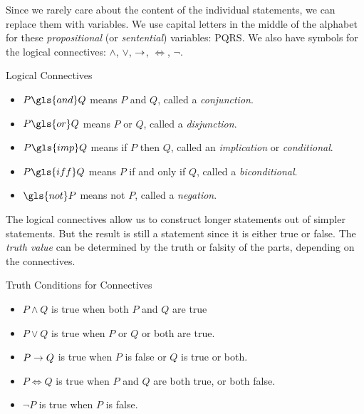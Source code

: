 \documentclass[12pt]{article}
\begin{document}
Since we rarely care about the content of the individual statements, we can replace them with variables.  We use capital letters in the middle of the alphabet for these {\em propositional} (or {\em sentential}) variables: \gls{PQRS}.  We also have symbols for the logical connectives: $\wedge$, $\vee$, $\rightarrow$, $\iff$, $\neg$.

\begin{defbox}{Logical Connectives}
\begin{itemize}
 \item $P \gls{and} Q$ means  $P$ and $Q$, called a {\em conjunction}.
\item $P \gls{or} Q$ means $P$ or $Q$, called a {\em disjunction}.
\item $P \gls{imp} Q$ means if $P$ then $Q$, called an {\em implication} or {\em conditional}.
\item $P \gls{iff} Q$ means $P$ if and only if $Q$, called a {\em biconditional}.
\item $\gls{not} P$ means not $P$, called a {\em negation}.
\end{itemize}
\end{defbox}

The logical connectives allow us to construct longer statements out of simpler statements.  But the result is still a statement since it is either true or false.  The {\em truth value} can be determined by the truth or falsity of the parts, depending on the connectives.  


\begin{defbox}{Truth Conditions for Connectives}
\begin{itemize}
 \item $P \wedge Q$ is true when both $P$ and $Q$ are true
\item $P \vee Q$ is true when $P$ or $Q$ or both are true.
\item $P \rightarrow Q$ is true when $P$ is false or $Q$ is true or both.
\item $P \iff Q$ is true when $P$ and $Q$ are both true, or both false.
\item $\neg P$ is true when $P$ is false. 
\end{itemize}
\end{defbox}
\end{document}
